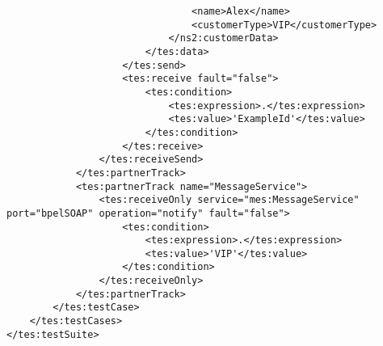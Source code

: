 \begin{appendix}
\begin{tiny}
\begin{verbatim}
                                <name>Alex</name>
                                <customerType>VIP</customerType>
                            </ns2:customerData>
                        </tes:data>
                    </tes:send>
                    <tes:receive fault="false">
                        <tes:condition>
                            <tes:expression>.</tes:expression>
                            <tes:value>'ExampleId'</tes:value>
                        </tes:condition>
                    </tes:receive>
                </tes:receiveSend>
            </tes:partnerTrack>
            <tes:partnerTrack name="MessageService">
                <tes:receiveOnly service="mes:MessageService" port="bpelSOAP" operation="notify" fault="false">
                    <tes:condition>
                        <tes:expression>.</tes:expression>
                        <tes:value>'VIP'</tes:value>
                    </tes:condition>
                </tes:receiveOnly>
            </tes:partnerTrack>
        </tes:testCase>
    </tes:testCases>
</tes:testSuite>
\end{verbatim}
\end{tiny}
\end{appendix}